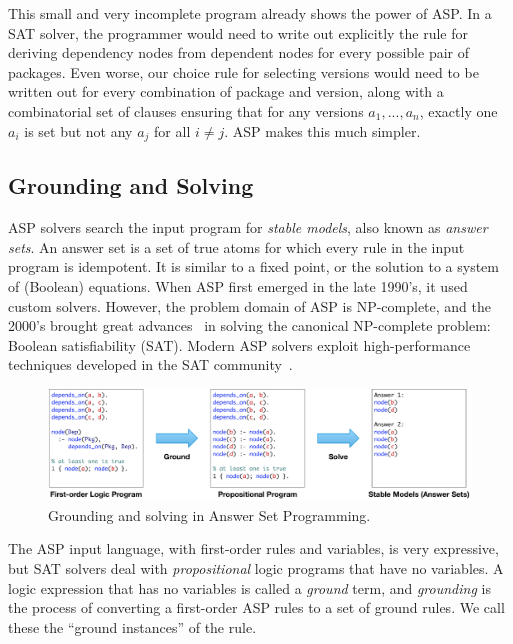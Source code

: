 This small and very incomplete program already shows the power of ASP. In a SAT
solver, the programmer would need to write out explicitly the rule for deriving
dependency nodes from dependent nodes for every possible pair of packages. Even worse,
our choice rule for selecting versions would need to be written out for every
combination of package and version, along with a combinatorial set of clauses
ensuring that for any versions \texttt{$a_1, ..., a_n$}, exactly one
\texttt{$a_i$} is set but not any \texttt{$a_j$} for all $i\neq{j}$. ASP
makes this much simpler.


\subsection{Grounding and Solving}

ASP solvers search the input program for {\it stable models}, also known as
\textit{answer sets}. An answer set is a set of true atoms for which every rule in the
input program is idempotent. It is similar to a fixed point, or the solution to a system
of (Boolean) equations. When ASP first emerged in the late 1990's, it used custom solvers.
However, the problem domain of ASP is NP-complete, and the 2000's brought great
advances~\cite{moskewicz2001chaff} in solving the canonical NP-complete problem: Boolean
satisfiability (SAT). Modern ASP solvers exploit high-performance techniques developed
in the SAT community~\cite{gebser+:asp-book}.

\begin{figure}[t]
  \centering
  \includegraphics[width=.8\textwidth]{figures/asp-grounding.pdf}
  \caption{
    Grounding and solving in Answer Set Programming.
    \label{fig:ground-solve}
    \vspace{-1em}
  }
\end{figure}

The ASP input language, with first-order rules and variables, is very expressive, but
SAT solvers deal with {\it propositional} logic programs that have no variables. A logic
expression that has no variables is called a {\it ground} term, and {\it grounding} is
the process of converting a first-order ASP rules to a set of ground rules. We call
these the ``ground instances'' of the rule.

